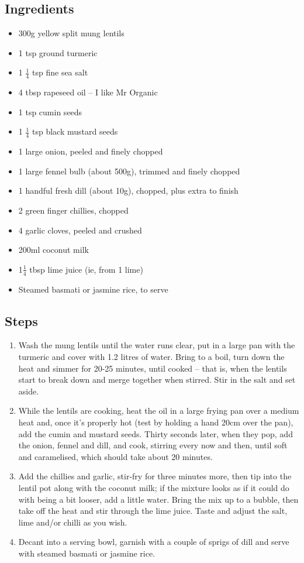 \documentclass{book}
\begin{document}
\subsection*{Ingredients}
\begin{itemize}
\item 300g yellow split mung lentils
\item 1 tsp ground turmeric
\item 1 $\frac{1}{4}$ tsp fine sea salt
\item 4 tbsp rapeseed oil – I like Mr Organic
\item 1 tsp cumin seeds
\item 1 $\frac{1}{4}$ tsp black mustard seeds
\item 1 large onion, peeled and finely chopped
\item 1 large fennel bulb (about 500g), trimmed and finely chopped
\item 1 handful fresh dill (about 10g), chopped, plus extra to finish
\item 2 green finger chillies, chopped
\item 4 garlic cloves, peeled and crushed
\item 200ml coconut milk
\item 1$\frac{1}{4}$ tbsp lime juice (ie, from 1 lime)
\item Steamed basmati or jasmine rice, to serve
\end{itemize}

\subsection*{Steps}
\begin{enumerate}
\item Wash the mung lentils until the water runs clear, put in a large pan with the turmeric and cover with 1.2 litres of water. Bring to a boil, turn down the heat and simmer for 20-25 minutes, until cooked – that is, when the lentils start to break down and merge together when stirred. Stir in the salt and set aside.
\item While the lentils are cooking, heat the oil in a large frying pan over a medium heat and, once it’s properly hot (test by holding a hand 20cm over the pan), add the cumin and mustard seeds. Thirty seconds later, when they pop, add the onion, fennel and dill, and cook, stirring every now and then, until soft and caramelised, which should take about 20 minutes.
\item Add the chillies and garlic, stir-fry for three minutes more, then tip into the lentil pot along with the coconut milk; if the mixture looks as if it could do with being a bit looser, add a little water. Bring the mix up to a bubble, then take off the heat and stir through the lime juice. Taste and adjust the salt, lime and/or chilli as you wish.
\item Decant into a serving bowl, garnish with a couple of sprigs of dill and serve with steamed basmati or jasmine rice.
\end{enumerate}
\newpage
\end{document}
